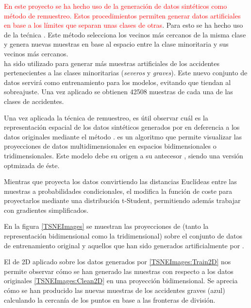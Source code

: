             \textcolor{red}{En este proyecto se ha hecho uso de la generación de datos sintéticos como método de remuestreo. Estos procedimientos permiten generar datos artificiales en base a los límites que separan unas clases de otras}. Para esto se ha hecho uso de la tećnica  \cite{SMOTEII}. Este método selecciona los vecinos más cercanos de la misma clase y genera nuevas muestras en base al espacio entre la clase minoritaria y sus vecinos más cercanos.\\

             ha sido utilizado para generar más muestras artificiales de los accidentes pertenecientes a las clases minoritarias (\textit{severos} y \textit{graves}). Este nuevo conjunto de datos servirá como entrenamiento para los modelos, evitando que tiendan al sobreajuste. Una vez aplicado  se obtienen 42508 muestras de cada una de las clases de accidentes.
    

            Una vez aplicada la técnica de remuestreo, es útil observar cuál es la representación espacial de los datos sintéticos generados por  en deferencia a los datos originales mediante el método  \cite{TSNEPaper}.  es un algoritmo que permite visualizar las proyecciones de datos multidimensionales en espacios bidimensionales o tridimensionales. Este modelo debe su origen a su antecesor , siendo una versión optmizada de éste.

            Mientras que  proyecta los datos convirtiendo las distancias Euclídeas entre las muestras a probabilidades condicionales, el  modifica la función de coste para proyectarlos mediante una distribución t-Student, permitiendo además trabajar con gradientes simplificados.


            En la figura \eqref{TSNEImages} se muestran las proyecciones de  (tanto la representación bidimensional como la tridimensional) sobre el conjunto de datos de entrenamiento original y aquellos que han sido generados artificialmente por .

            El  de 2D aplicado sobre los datos generados por  \eqref{TSNEImages:Train2D} nos permite observar cómo se han generado las muestras con respecto a los datos originales \eqref{TSNEImages:Clean2D} en una proyección bidimensional. Se aprecia cómo se han producido las nuevas muestras de los accidentes graves (azul) calculando la cercanía de los puntos en base a las fronteras de división.


